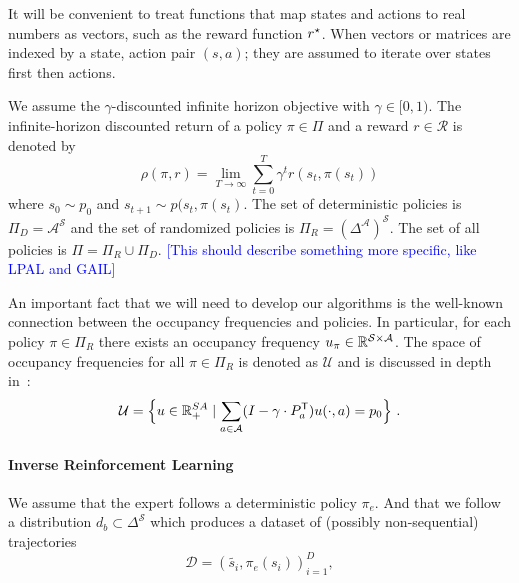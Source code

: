 \documentclass[11pt]{uai2023}
\newcommand{\mm}[1]{\textcolor{blue}{[#1]}}
\begin{document}
It will be convenient to treat functions that map states and actions to real numbers as vectors, such as the reward function $r^{\mathnormal{\star}}$. When vectors or matrices are indexed by a state, action pair $(s,a)$; they are assumed to iterate over states first then actions.

We assume the $\gamma$-discounted infinite horizon objective with $\gamma \in [0,1)$. The infinite-horizon discounted return of a policy $\pi \in \Pi$ and a reward $r \in \mathcal{R}$ is denoted by 
\[\rho(\pi, r) = \lim_{T\to\infty} \sum_{t=0}^{T} \gamma^t r(s_t,\pi(s_t))\]
where $s_0 \sim p_0$ and $s_{t+1} \sim p(s_t, \pi(s_t)$. 
The set of deterministic policies is $\Pi_D= \mathcal{A}^{\mathcal{S}}$ and the set of randomized policies is $\Pi_R = {\left(\Delta^{\mathcal{A}}\right)}^{\mathcal{S}}$. The set of all policies is $\Pi = \Pi_R \cup \Pi_D$.
\mm{This should describe something more specific, like LPAL and GAIL}

An important fact that we will need to develop our algorithms is the well-known connection between the occupancy frequencies and policies. In particular, for each policy $\pi\in\Pi_R$
there exists an occupancy frequency $u_{\pi}\in \mathbb{R}^{\mathcal{S}\times \mathcal{A}}$. The space of occupancy frequencies for all $\pi\in \Pi_R$
is denoted as $\mathcal{U}$ and is discussed in depth in~\cite{Puterman1994}:
\[
  \mathcal{U}
  = \Bigl\{ u\in \mathbb{R}^{SA}_{+} \mid \sum_{a\in \mathcal{A}} (I - \gamma\cdot P^{\mathsf{T}}_a) u(\cdot, a) = p_0 \Bigr\}~.
\]

\paragraph{Inverse Reinforcement Learning}
We assume that the expert follows a deterministic policy $\pi_e$. And that we follow a distribution $d_b \subset \Delta^{\mathcal{S}}$ which produces a dataset of (possibly non-sequential) trajectories \[
  \mathcal{D} = {(\tilde{s_i}, \pi_e(s_i))}_{i=1}^D,
\]
\end{document}
